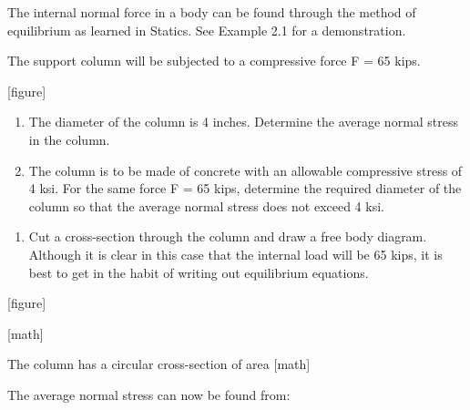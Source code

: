 \documentclass[
  letterpaper,
  DIV=11,
  numbers=noendperiod]{scrreprt}
\providecommand{\tightlist}{%
  \setlength{\itemsep}{0pt}\setlength{\parskip}{0pt}}\usepackage{longtable,booktabs,array}
\begin{document}
The internal normal force in a body can be found through the method of
equilibrium as learned in Statics. See Example 2.1 for a demonstration.

\begin{tcolorbox}[enhanced jigsaw, colback=white, colframe=quarto-callout-note-color-frame, leftrule=.75mm, opacitybacktitle=0.6, colbacktitle=quarto-callout-note-color!10!white, arc=.35mm, bottomrule=.15mm, breakable, title={Example 2.1: Simple normal stress}, left=2mm, titlerule=0mm, toptitle=1mm, toprule=.15mm, opacityback=0, rightrule=.15mm, coltitle=black, bottomtitle=1mm]

The support column will be subjected to a compressive force F = 65 kips.

{[}figure{]}

\begin{enumerate}
\def\labelenumi{\arabic{enumi}.}
\item
  The diameter of the column is 4 inches. Determine the average normal
  stress in the column.
\item
  The column is to be made of concrete with an allowable compressive
  stress of 4 ksi. For the same force F = 65 kips, determine the
  required diameter of the column so that the average normal stress does
  not exceed 4 ksi.
\end{enumerate}

\begin{tcolorbox}[enhanced jigsaw, colback=white, colframe=quarto-callout-note-color-frame, leftrule=.75mm, opacitybacktitle=0.6, colbacktitle=quarto-callout-note-color!10!white, arc=.35mm, bottomrule=.15mm, breakable, title={Solution}, left=2mm, titlerule=0mm, toptitle=1mm, toprule=.15mm, opacityback=0, rightrule=.15mm, coltitle=black, bottomtitle=1mm]

\begin{enumerate}
\def\labelenumi{\arabic{enumi}.}
\tightlist
\item
  Cut a cross-section through the column and draw a free body diagram.
  Although it is clear in this case that the internal load will be 65
  kips, it is best to get in the habit of writing out equilibrium
  equations.
\end{enumerate}

{[}figure{]}

{[}math{]}

The column has a circular cross-section of area {[}math{]}

The average normal stress can now be found from:


\end{tcolorbox}
\end{tcolorbox}
\end{document}
